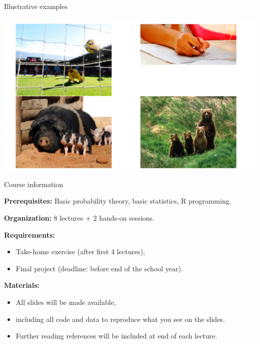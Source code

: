 \begin{frame}{Illustrative examples}

\bigskip

\begin{center}
\includegraphics[width=0.80\linewidth]{../LectureAssets/L00/IllustrativeExamples}

\end{center}

\bigskip

\end{frame}

\begin{frame}[fragile]{Course information}

\textbf{Prerequisites:} Basic probability theory, basic statistics, R programming.

\bigskip

\textbf{Organization:} 8 lectures + 2 hands-on sessions.

\bigskip

\textbf{Requirements:}

\begin{itemize}
\item Take-home exercise (after first 4 lectures),
\item Final project (deadline: before end of the school year).
\end{itemize}

\bigskip

\textbf{Materials:}

\begin{itemize}
\item All slides will be made available,
\item including all code and data to reproduce what you see on the slides.
\item Further reading references will be included at end of each lecture.
\end{itemize}

\bigskip

\end{frame}

